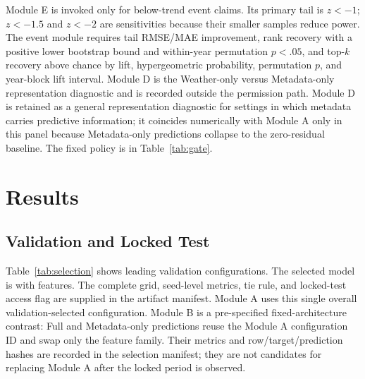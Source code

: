 \documentclass[conference]{IEEEtran}
\renewcommand{\arraystretch}{0.98}
\begin{document}
Module E is invoked only for below-trend event claims. Its primary tail is $z<-1$;
$z<-1.5$ and $z<-2$ are sensitivities because their smaller samples reduce power.
The event module requires tail RMSE/MAE improvement, rank recovery with a positive
lower bootstrap bound and within-year permutation $p<.05$, and top-$k$ recovery
above chance by lift, hypergeometric probability, permutation $p$, and year-block
lift interval. Module D is the Weather-only versus Metadata-only representation
diagnostic and is recorded outside the permission path. Module D is retained as a
general representation diagnostic for settings in which metadata carries
predictive information; it coincides numerically with Module A only in this panel
because Metadata-only predictions collapse to the zero-residual baseline. The
fixed policy is in Table~\ref{tab:gate}.

\begin{table}[t]
\centering
\caption{Fixed claim modules. Module A controls overall predictive claims,
Module B controls weather-specific predictive reliance, Module E controls
below-trend event-recovery claims, and Module D is diagnostic only. Full
configuration details are in the reproducibility manifest.}
\label{tab:gate}
\footnotesize
\renewcommand{\arraystretch}{1.12}

\end{table}

\section{Results}
\subsection{Validation and Locked Test}
Table~\ref{tab:selection} shows leading validation configurations. The selected
model is \AuditSelectedModel{} with \AuditSelectedFamily{} features. The complete
grid, seed-level metrics, tie rule, and locked-test access flag are supplied in the
artifact manifest. Module A uses this single overall validation-selected
configuration. Module B is a pre-specified fixed-architecture contrast: Full and
Metadata-only predictions reuse the Module A configuration ID and swap only the
feature family. Their metrics and row/target/prediction hashes are recorded in
the selection manifest; they are not candidates for replacing Module A after the
locked period is observed.

\begin{table}[t]
\centering
\caption{Validation selection on 2012--2015. RMSE is computed after fixed-seed
prediction aggregation; Seed SD is the across-seed RMSE standard deviation, and
$P$(rank 1) is the seed-level first-rank frequency for stochastic candidates;
Ridge is deterministic and shown as N/A. Role separates the Module A winner from
the fixed-architecture Module B/D representatives.}
\label{tab:selection}
\scriptsize
\resizebox{\columnwidth}{!}{}
\end{table}
\end{document}

